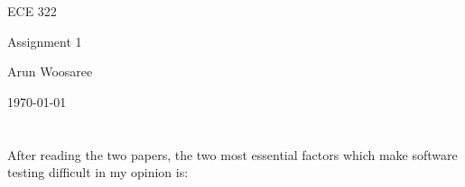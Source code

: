\documentclass[letterpaper]{article}
\begin{document}
\begin{titlepage}
 \begin{center}
  \vspace*{1cm}
  \Huge
  ECE 322
  \vspace{1cm}
  
  Assignment 1
  \vspace{1cm}
  
  Arun Woosaree
  
  \today
  \vfill
 \end{center}
\end{titlepage}

\section{}
After reading the two papers, the two most essential factors which make software testing difficult in my opinion is: 
\end{document}
